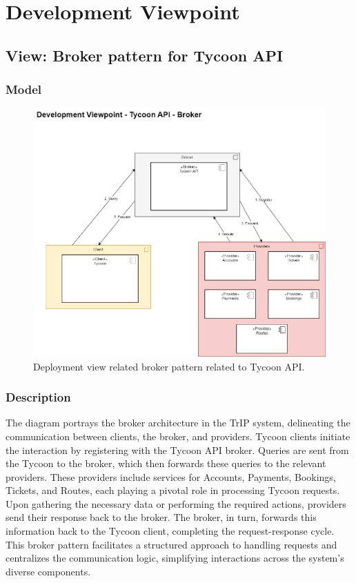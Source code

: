 \section{Development Viewpoint}
\subsection{View: Broker pattern for Tycoon API}
\subsubsection{Model}
\begin{figure}[H]
    \centering
    \includegraphics[width=\textwidth]{drawings/views_final_version/development_view_broker.png}
    \caption{Deployment view related broker pattern related to Tycoon API.}
    \label{fig:development_view_broker}
\end{figure}

\subsubsection{Description}
The diagram portrays the broker architecture in the TrIP system, delineating the communication between clients, the broker, and providers. Tycoon clients initiate the interaction by registering with the Tycoon API broker. Queries are sent from the Tycoon to the broker, which then forwards these queries to the relevant providers. These providers include services for Accounts, Payments, Bookings, Tickets, and Routes, each playing a pivotal role in processing Tycoon requests. Upon gathering the necessary data or performing the required actions, providers send their response back to the broker. The broker, in turn, forwards this information back to the Tycoon client, completing the request-response cycle. This broker pattern facilitates a structured approach to handling requests and centralizes the communication logic, simplifying interactions across the system’s diverse components.

